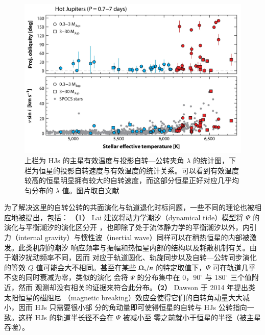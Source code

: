 \begin{figure}[t!]
\centering
\includegraphics[width=1.0\textwidth]{figures/chapter4/fig7_hjobliq.jpeg}
\caption[上栏为 HJs 的主星有效温度与投影自转---公转夹角 $\lambda$ 的统计图，下栏为恒星的投影自转速度与有效温度的统计关系。可以看到有效温度较高的恒星明显拥有较大的自转速度，而这部分恒星正好对应几乎均匀分布的 $\lambda$ 值。图片版权 Winn 和 Fabrycky。]{上栏为 HJs 的主星有效温度与投影自转---公转夹角 $\lambda$ 的统计图，下栏为恒星的投影自转速度与有效温度的统计关系。可以看到有效温度较高的恒星明显拥有较大的自转速度，而这部分恒星正好对应几乎均匀分布的 $\lambda$ 值。图片取自文献 }
\label{fig:hjobliq}
\end{figure}

为了解决这里的自转公转的共面演化与轨道退化时标问题，一些不同的理论也被相应地被提出，包括：
\textbf{（1）} Lai 建议将动力学潮汐（dynamical tide）模型将 $\Psi$ 的演化与平衡潮汐的演化区分开
\cite{Lai2012}，也即除了处于流体静力学的平衡潮汐以外，内引力（internal gravity）与惯性波（inertial 
wave）同样可以在稍热恒星的内部被激发\cite{Ogilvie2004,Ogilvie2007,Ogilvie2014}。此类机制的潮汐
响应频率与振幅和热恒星内部的结构以及耗散机制有关\cite{Ogilvie2007}。由于潮汐扰动频率不同，因而
对应于轨道圆化、轨旋同步以及自转---公转同步演化的等效 $Q$ 值可能会大不相同。甚至在某些 
$\Omega_\mathrm{s}/n$ 的特定取值下，$\Psi$ 可在轨道几乎不变的同时衰减为零\cite{Lai2012}，类似的演化
会将 $\Psi$ 的分布集中在 0，$90^\circ$ 与 $180^\circ$ 三个值附近\cite{Rogers2013,Xue2014}，然而
观测却没有相关的证据来符合此分布。\textbf{（2）} Dawson 于 2014 年提出类太阳恒星的磁阻尼
（magnetic breaking）效应\cite{Kraft1967}会使得它们的自转角动量大大减小，因而 HJs 只需要很小部
分的角动量即可使得恒星的自转与 HJs 公转指向一致。这样 HJs 的轨道半长径不会在 $\Psi$ 被减小至
零之前就小于恒星的半径（被主星吞噬）\cite{Dawson2014}。


